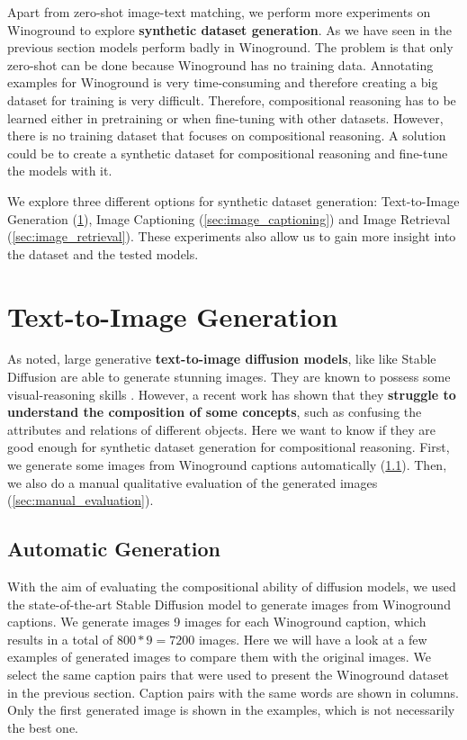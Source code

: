 Apart from zero-shot image-text matching, we perform more experiments on Winoground to explore \textbf{synthetic dataset generation}. As we have seen in the previous section models perform badly in Winoground. The problem is that only zero-shot can be done because Winoground has no training data. Annotating examples for Winoground is very time-consuming and therefore creating a big dataset for training is very difficult. Therefore, compositional reasoning has to be learned either in pretraining or when fine-tuning with other datasets. However, there is no training dataset that focuses on compositional reasoning. A solution could be to create a synthetic dataset for compositional reasoning and fine-tune the models with it.

We explore three different options for synthetic dataset generation: Text-to-Image Generation (\ref{sec:text_to_image_generation}), Image Captioning (\ref{sec:image_captioning}) and Image Retrieval (\ref{sec:image_retrieval}). These experiments also allow us to gain more insight into the dataset and the tested models.

\section{Text-to-Image Generation} \label{sec:text_to_image_generation}

As noted, large generative \textbf{text-to-image diffusion models}, like like Stable Diffusion \cite{rombach2021highresolution} are able to generate stunning images. They are known to possess some visual-reasoning skills \cite{cho2022dall}. However, a recent work \cite{liu2022compositional} has shown that they \textbf{struggle to understand the composition of some concepts}, such as confusing the attributes and relations of different objects. Here we want to know if they are good enough for synthetic dataset generation for compositional reasoning. First, we generate some images from Winoground captions automatically (\cref{sec:automatic_generation}). Then, we also do a manual qualitative evaluation of the generated images (\cref{sec:manual_evaluation}).

\subsection{Automatic Generation} \label{sec:automatic_generation}

With the aim of evaluating the compositional ability of diffusion models, we used the state-of-the-art Stable Diffusion model \cite{rombach2021highresolution} to generate images from Winoground captions. We generate images 9 images for each Winoground caption, which results in a total of $800*9=7200$ images. Here we will have a look at a few examples of generated images to compare them with the original images. We select the same caption pairs that were used to present the Winoground dataset in the previous section. Caption pairs with the same words are shown in columns. Only the first generated image is shown in the examples, which is not necessarily the best one.

